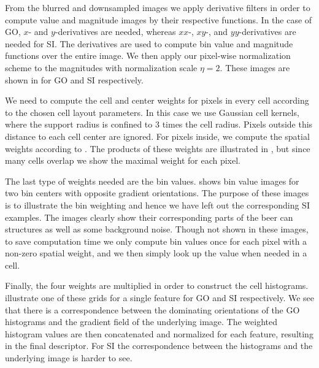 \documentclass[thesis.tex]{subfiles}
\begin{document}
From the blurred and downsampled images we apply derivative filters in order to compute value and magnitude images by their respective functions. In the case of GO, $x$- and $y$-derivatives are needed, whereas $xx$-, $xy$-, and $yy$-derivatives are needed for SI. The derivatives are used to compute bin value and magnitude functions over the entire image. We then apply our pixel-wise normalization scheme to the magnitudes with normalization scale $\eta = 2$. These images are shown in  for GO and SI respectively.

We need to compute the cell and center weights for pixels in every cell according to the chosen cell layout parameters. In this case we use Gaussian cell kernels, where the support radius is confined to $3$ times the cell radius. Pixels outside this distance to each cell center are ignored. For pixels inside, we compute the spatial weights according to . The products of these weights are illustrated in , but since many cells overlap we show the maximal weight for each pixel.

The last type of weights needed are the bin values.  shows bin value images for two bin centers with opposite gradient orientations. The purpose of these images is to illustrate the bin weighting and hence we have left out the corresponding SI examples. The images clearly show their corresponding parts of the beer can structures as well as some background noise. Though not shown in these images, to save computation time we only compute bin values once for each pixel with a non-zero spatial weight, and we then simply look up the value when needed in a cell.

Finally, the four weights are multiplied in order to construct the cell histograms.  illustrate one of these grids for a single feature for GO and SI respectively. We see that there is a correspondence between the dominating orientations of the GO histograms and the gradient field of the underlying image. The weighted histogram values are then concatenated and normalized for each feature, resulting in the final descriptor. For SI the correspondence between the histograms and the underlying image is harder to see.
\end{document}
